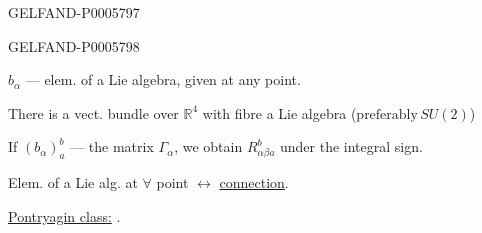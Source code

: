 \begin{GelfandAdjacentEvidence}{GELFAND-P000579}{7}

\end{GelfandAdjacentEvidence}
\begin{GelfandAdjacentEvidence}{GELFAND-P000579}{8}


\(b_\alpha\) — elem. of a Lie algebra, given at any point.

There is a vect. bundle over \(\mathbb R^4\) with fibre a Lie algebra (\(\text{preferably}\,SU(2)\))

If \((b_\alpha)_a^b\) — the matrix \(\Gamma_\alpha\), we obtain
\(R_{\alpha\beta a}^b\) under the integral sign.

Elem. of a Lie alg. at \(\forall\) point \(\longleftrightarrow\) \underline{connection}.

\underline{Pontryagin class:}\quad
{}.
\end{GelfandAdjacentEvidence}



